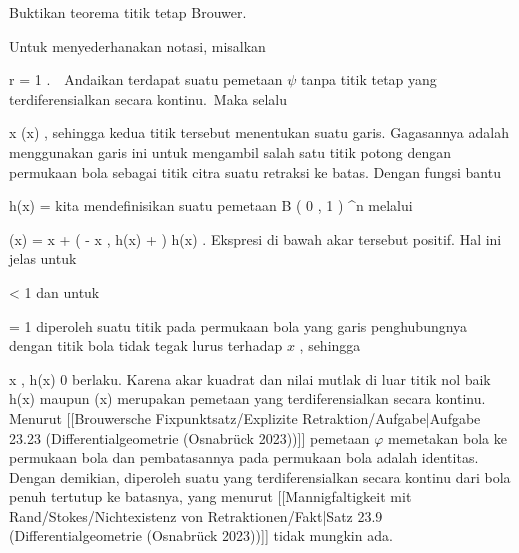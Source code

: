 {

Buktikan teorema titik tetap Brouwer.

}
{

Untuk menyederhanakan notasi, misalkan

\mavergleichskette
{\vergleichskette
{ r
}
{ = }{ 1
}
{  }{
}
{    }{
}
{   }{
}
}
{}{}{.}  Andaikan terdapat suatu pemetaan $\psi$ tanpa titik tetap yang terdiferensialkan secara kontinu. Maka selalu

\mavergleichskettedisp
{\vergleichskette
{ x
}
{ \neq} { \psi(x)
}
{ } {
}
{ } {
}
{ } {
}
}
{}{}{,}
sehingga kedua titik tersebut menentukan suatu garis. Gagasannya adalah menggunakan garis ini untuk mengambil salah satu
 {} {}
titik potong dengan permukaan bola sebagai titik citra suatu retraksi ke batas. Dengan fungsi bantu

\mavergleichskettedisp
{\vergleichskette
{ h(x)
}
{ =} { {  }
}
{ } {
}
{ } {
}
{ } {
}
}
{}{}{}
kita mendefinisikan suatu pemetaan
\maabbdisp {\varphi} { B  \left(  0 , 1 \right) } { \R^n
} {}
melalui

\mavergleichskettedisphandlinks
{\vergleichskettedisphandlinks
{ \varphi(x)
}
{ =} { x + \left(  - \left\langle  x  , h(x)  \right\rangle +   \right) \cdot h(x)
}
{ } {
}
{ } {
}
{ } {
}
}
{}{}{.}
Ekspresi di bawah akar tersebut positif. Hal ini jelas untuk

\mavergleichskette
{\vergleichskette
{  \Vert
}
{ < }{ 1
}
{  }{
}
{    }{
}
{   }{
}
}
{}{}{}
dan untuk

\mavergleichskette
{\vergleichskette
{  \Vert
}
{ = }{ 1
}
{  }{
}
{    }{
}
{   }{
}
}
{}{}{}
diperoleh suatu titik pada permukaan bola yang garis penghubungnya dengan titik bola
 tidak tegak lurus terhadap $x$
 {} {,}
sehingga

\mavergleichskettedisp
{\vergleichskette
{ \left\langle  x  , h(x)  \right\rangle
}
{ \neq} { 0
}
{ } {
}
{ } {
}
{ } {
}
}
{}{}{}
berlaku. Karena akar kuadrat dan nilai mutlak di luar titik nol
baik
\mathkor {} {h(x)} {maupun} {\varphi(x)} {}
merupakan pemetaan yang terdiferensialkan secara kontinu. Menurut
[[Brouwersche Fixpunktsatz/Explizite Retraktion/Aufgabe|Aufgabe 23.23 (Differentialgeometrie (Osnabrück 2023))]]
pemetaan $\varphi$ memetakan bola ke permukaan bola dan pembatasannya pada permukaan bola adalah identitas. Dengan demikian, diperoleh suatu
yang terdiferensialkan secara kontinu dari bola penuh tertutup ke batasnya, yang menurut
[[Mannigfaltigkeit mit Rand/Stokes/Nichtexistenz von Retraktionen/Fakt|Satz 23.9 (Differentialgeometrie (Osnabrück 2023))]]
tidak mungkin ada.

 }

